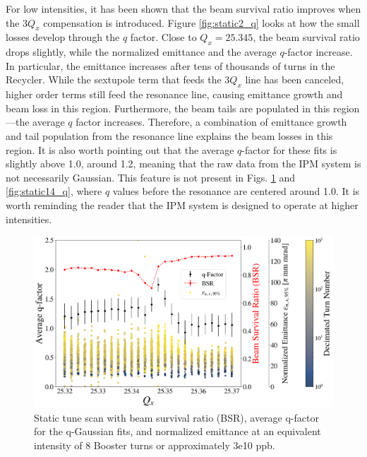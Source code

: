 For low intensities, it has been shown that the beam survival ratio improves when the $3Q_x$ compensation is introduced. Figure \ref{fig:static2_q} looks at how the small losses develop through the $q$ factor. Close to $Q_x=25.345$, the beam survival ratio drops slightly, while the normalized emittance and the average $q$-factor increase. In particular, the emittance increases after tens of thousands of turns in the Recycler. While the sextupole term that feeds the $3Q_x$ line has been canceled, higher order terms still feed the resonance line, causing emittance growth and beam loss in this region. Furthermore, the beam tails are populated in this region---the average $q$ factor increases. Therefore, a combination of emittance growth and tail population from the resonance line explains the beam losses in this region. It is also worth pointing out that the average $q$-factor for these fits is slightly above 1.0, around 1.2, meaning that the raw data from the IPM system is not necessarily Gaussian. This feature is not present in Figs. \ref{fig:static8_q} and \ref{fig:static14_q}, where $q$ values before the resonance are centered around 1.0. It is worth reminding the reader that the IPM system is designed to operate at higher intensities. 

\begin{figure}[H]
    \centering
    \includegraphics[width=\columnwidth]{chapter6/static8turns_emittance_dampersOFF.png}
    \caption{Static tune scan with beam survival ratio (BSR), average q-factor for the q-Gaussian fits, and normalized emittance at an equivalent intensity of 8 Booster turns or approximately 3e10 ppb.}
    \label{fig:static8_q}
   \vspace{-1.25em}
\end{figure}

